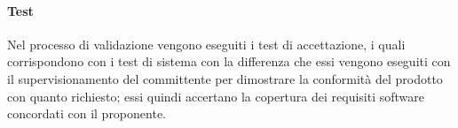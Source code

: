 \documentclass[../norme-di-progetto.tex]{subfiles}
\begin{document}
\paragraph{Test}
Nel processo di validazione vengono eseguiti i test di accettazione, i quali corrispondono con i test di sistema con la differenza che essi vengono eseguiti con il supervisionamento del committente per dimostrare la conformità del prodotto con quanto richiesto; essi quindi accertano la copertura dei requisiti software concordati con il proponente.
\end{document}
